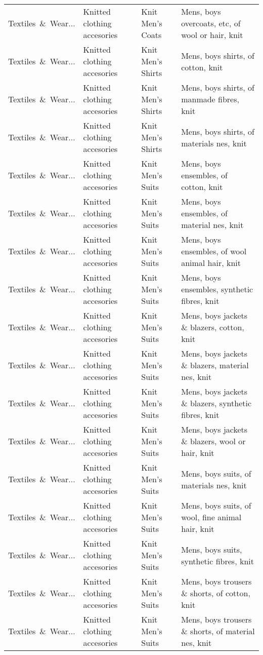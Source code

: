 \begin{appendices}
\begin{xltabular}{\textwidth}{|p{0.10\textwidth}|p{0.25\textwidth}|p{0.24\textwidth}|p{0.31\textwidth}|}
Textiles\ \&\ Wear... & Knitted clothing accesories & Knit Men's Coats & Mens, boys overcoats, etc, of wool or hair, knit \\
Textiles\ \&\ Wear... & Knitted clothing accesories & Knit Men's Shirts & Mens, boys shirts, of cotton, knit \\
Textiles\ \&\ Wear... & Knitted clothing accesories & Knit Men's Shirts & Mens, boys shirts, of manmade fibres, knit \\
Textiles\ \&\ Wear... & Knitted clothing accesories & Knit Men's Shirts & Mens, boys shirts, of materials nes, knit \\
Textiles\ \&\ Wear... & Knitted clothing accesories & Knit Men's Suits & Mens, boys ensembles, of cotton, knit \\
Textiles\ \&\ Wear... & Knitted clothing accesories & Knit Men's Suits & Mens, boys ensembles, of material nes, knit \\
Textiles\ \&\ Wear... & Knitted clothing accesories & Knit Men's Suits & Mens, boys ensembles, of wool animal hair, knit \\
Textiles\ \&\ Wear... & Knitted clothing accesories & Knit Men's Suits & Mens, boys ensembles, synthetic fibres, knit \\
Textiles\ \&\ Wear... & Knitted clothing accesories & Knit Men's Suits & Mens, boys jackets \& blazers, cotton, knit \\
Textiles\ \&\ Wear... & Knitted clothing accesories & Knit Men's Suits & Mens, boys jackets \& blazers, material nes, knit \\
Textiles\ \&\ Wear... & Knitted clothing accesories & Knit Men's Suits & Mens, boys jackets \& blazers, synthetic fibres, knit \\
Textiles\ \&\ Wear... & Knitted clothing accesories & Knit Men's Suits & Mens, boys jackets \& blazers, wool or hair, knit \\
Textiles\ \&\ Wear... & Knitted clothing accesories & Knit Men's Suits & Mens, boys suits, of materials nes, knit \\
Textiles\ \&\ Wear... & Knitted clothing accesories & Knit Men's Suits & Mens, boys suits, of wool, fine animal hair, knit \\
Textiles\ \&\ Wear... & Knitted clothing accesories & Knit Men's Suits & Mens, boys suits, synthetic fibres, knit \\
Textiles\ \&\ Wear... & Knitted clothing accesories & Knit Men's Suits & Mens, boys trousers \& shorts, of cotton, knit \\
Textiles\ \&\ Wear... & Knitted clothing accesories & Knit Men's Suits & Mens, boys trousers \& shorts, of material nes, knit \\

\end{xltabular}
\end{appendices}
